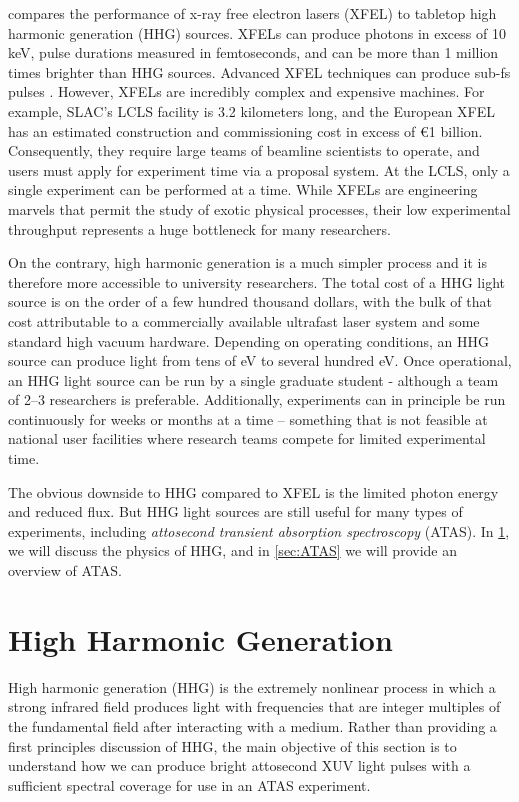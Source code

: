  compares the performance of x-ray free electron lasers (XFEL) to tabletop high harmonic generation (HHG) sources. XFELs can produce photons in excess of 10 keV, pulse durations measured in femtoseconds, and can be more than 1 million times brighter than HHG sources. Advanced XFEL techniques can produce sub-fs pulses \cite{dingGenerationAttosecondXray2009}. However, XFELs are incredibly complex and expensive machines. For example, SLAC's LCLS facility is 3.2 kilometers long, and the European XFEL has an estimated construction and commissioning cost in excess of \euro1 billion. Consequently, they require large teams of beamline scientists to operate, and users must apply for experiment time via a proposal system. At the LCLS, only a single experiment can be performed at a time. While XFELs are engineering marvels that permit the study of exotic physical processes, their low experimental throughput represents a huge bottleneck for many researchers.

On the contrary, high harmonic generation is a much simpler process and it is therefore more accessible to university researchers. The total cost of a HHG light source is on the order of a few hundred thousand dollars, with the bulk of that cost attributable to a commercially available ultrafast laser system and some standard high vacuum hardware. Depending on operating conditions, an HHG source can produce light from tens of eV to several hundred eV. Once operational, an HHG light source can be run by a single graduate student - although a team of 2--3 researchers is preferable. Additionally, experiments can in principle be run continuously for weeks or months at a time -- something that is not feasible at national user facilities where research teams compete for limited experimental time.

The obvious downside to HHG compared to XFEL is the limited photon energy and reduced flux. But HHG light sources are still useful for many types of experiments, including \textit{attosecond transient absorption spectroscopy} (ATAS). In \cref{sec:HHG}, we will discuss the physics of HHG, and in \cref{sec:ATAS} we will provide an overview of ATAS.

\section{High Harmonic Generation}
\label{sec:HHG}

High harmonic generation (HHG) is the extremely nonlinear process in which a strong infrared field produces light with frequencies that are integer multiples of the fundamental field after interacting with a medium. Rather than providing a first principles discussion of HHG, the main objective of this section is to understand how we can produce bright attosecond XUV light pulses with a sufficient spectral coverage for use in an ATAS experiment.


